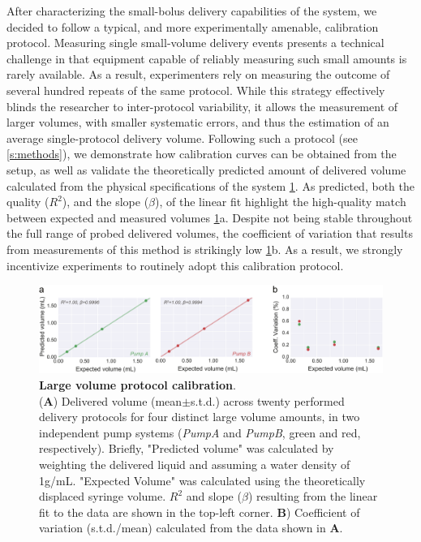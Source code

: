 After characterizing the small-bolus delivery capabilities of the system, we decided to follow a typical, and more experimentally amenable, calibration protocol. Measuring single small-volume delivery events presents a technical challenge in that equipment capable of reliably measuring such small amounts is rarely available. As a result, experimenters rely on measuring the outcome of several hundred repeats of the same protocol. While this strategy effectively blinds the researcher to inter-protocol variability, it allows the measurement of larger volumes, with smaller systematic errors, and thus the estimation of an average single-protocol delivery volume. Following such a protocol (see \ref{s:methods}), we demonstrate how calibration curves can be obtained from the setup, as well as validate the theoretically predicted amount of delivered volume calculated from the physical specifications of the system \ref{fig:LargeVolumeCalibration}. As predicted, both the quality  ($R^2$), and the slope ($\beta$), of the linear fit highlight the high-quality match between expected and measured volumes \ref{fig:LargeVolumeCalibration}a. Despite not being stable throughout the full range of probed delivered volumes, the coefficient of variation that results from measurements of this method is strikingly low \ref{fig:LargeVolumeCalibration}b. As a result, we strongly incentivize experiments to routinely adopt this calibration protocol.


\begin{figure}[ht] 
	\centering
	\includegraphics[width=1.0\linewidth]{Figures/Artboard 6.pdf}
	\caption{\textbf{Large volume protocol calibration}.\\
		(\textbf{A}) Delivered volume (mean$\pm$s.t.d.) across twenty performed delivery protocols for four distinct large volume amounts, in two independent pump systems (\textit{PumpA} and \textit{PumpB}, green and red, respectively). Briefly, "Predicted volume" was calculated by weighting the delivered liquid and assuming a water density of 1g/mL. "Expected Volume" was calculated using the theoretically displaced syringe volume.  $R^{2}$ and slope ($\beta$) resulting from the linear fit to the data are shown in the top-left corner. \textbf{B}) Coefficient of variation (s.t.d./mean) calculated from the data shown in \textbf{A}.}
	\label{fig:LargeVolumeCalibration} 
\end{figure}

